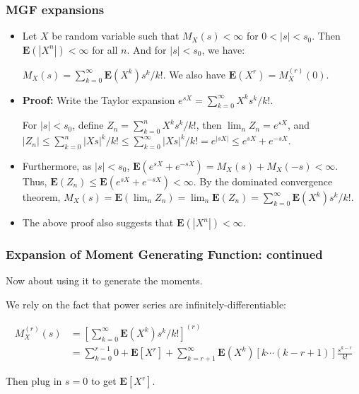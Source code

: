\documentclass[handout]{beamer}
\newcommand{\BE}{\mathbf{E}}
\begin{document}
\frame
{
  \frametitle{MGF expansions} 

   \begin{itemize}
                   \item<1->[] \begin{Theorem} Let $X$ be random variable such that $M_X(s)<\infty$ for $0 < |s|<s_0$. Then $\BE(|X^n|)<\infty$ for all $n$. And for $|s|<s_0$, we have:
                
                $M_X(s)=\sum_{k=0}^{\infty} \BE(X^k)s^k/k!.$ We also have $\BE(X^r)=M_X^{(r)} (0)$.                \end{Theorem}
                
                                
                \item<2->\textbf{Proof:} Write the Taylor expansion $e^{sX}=\sum_{k=0}^{\infty} X^ks^k/k!$.
                
                
                For $|s|<s_0$, define $Z_n=\sum_{k=0}^n X^ks^k/k!$, then $\lim_n Z_n= e^{sX}$, and $|Z_n|\leq \sum_{k=0}^n |Xs|^k /k! \leq \sum_{k=0}^{\infty} |Xs|^k/k! = e^{|sX|}\leq e^{sX}+ e^{-sX}$.
                 
                 \item<3->[-] Furthermore, as $|s|<s_0$, $\BE(e^{sX}+ e^{-sX}) =M_X(s)+M_X(-s)<\infty$. Thus, $\BE(Z_n)\leq \BE(e^{sX}+ e^{-sX})<\infty$. By the dominated convergence theorem, $M_X(s)=\BE(\lim_n Z_n)=\lim_n\BE(Z_n)=\sum_{k=0}^{\infty} \BE(X^k)s^k/k!.$
                
                
                 \item<4->[-] The above proof also suggests that  $\BE(|X^n|)<\infty$.
                
            
                
\end{itemize}
}


\frame
{
  \frametitle{Expansion of Moment Generating Function: continued} 

Now about using it to generate the moments. 

We rely on the fact that power series are infinitely-differentiable:

\begin{align*}
M_X^{(r)}(s) &= \left[ \sum_{k=0}^{\infty} \BE(X^k)s^k/k!\right]^{(r)} \\
&= \sum_{k=0}^{r-1} 0 + \BE[X^r] + \sum_{k=r+1}^{\infty}\BE(X^k)\left[k \cdots (k-r+1) \right]\frac{s^{k-r}}{k!} 
\end{align*}

Then plug in $s=0$ to get $\BE[X^r]$.

}
\end{document}
